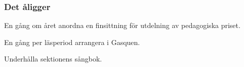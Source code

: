 \subsubsection{Det åligger \SEXIT}
\begin{att}
	\item En gång om året anordna en finsittning för utdelning av pedagogiska priset.
	\item En gång per läsperiod arrangera i Gasquen.
	\item Underhålla sektionens sångbok. 
\end{att}


\begin{comment}

\newpage

\newpage

\newpage

\newpage

\newpage

\newpage

\newpage

\newpage

\end{comment}